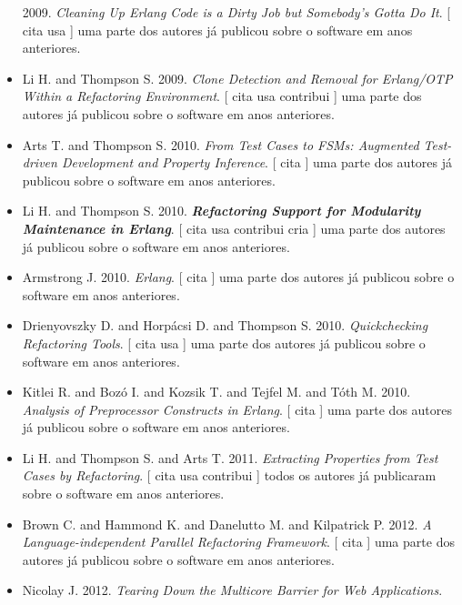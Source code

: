 \begin{itemize}
      2009.
        \textit{ Cleaning Up Erlang Code is a Dirty Job but Somebody's Gotta Do It}.
      [
          cita
          usa
      ]
uma parte dos autores já publicou sobre o software em anos anteriores.
\item Li H. and Thompson S.
      2009.
        \textit{ Clone Detection and Removal for Erlang/OTP Within a Refactoring Environment}.
      [
          cita
          usa
          contribui
      ]
uma parte dos autores já publicou sobre o software em anos anteriores.
\item Arts T. and Thompson S.
      2010.
        \textit{ From Test Cases to FSMs: Augmented Test-driven Development and Property Inference}.
      [
          cita
      ]
uma parte dos autores já publicou sobre o software em anos anteriores.
\item Li H. and Thompson S.
      2010.
        \textbf{\textit{ Refactoring Support for Modularity Maintenance in Erlang}}.
      [
          cita
          usa
          contribui
          cria
      ]
uma parte dos autores já publicou sobre o software em anos anteriores.
\item Armstrong J.
      2010.
        \textit{ Erlang}.
      [
          cita
      ]
uma parte dos autores já publicou sobre o software em anos anteriores.
\item Drienyovszky D. and Horp\'{a}csi D. and Thompson S.
      2010.
        \textit{ Quickchecking Refactoring Tools}.
      [
          cita
          usa
      ]
uma parte dos autores já publicou sobre o software em anos anteriores.
\item Kitlei R. and Boz\'{o} I. and Kozsik T. and Tejfel M. and T\'{o}th M.
      2010.
        \textit{ Analysis of Preprocessor Constructs in Erlang}.
      [
          cita
      ]
uma parte dos autores já publicou sobre o software em anos anteriores.
\item Li H. and Thompson S. and Arts T.
      2011.
        \textit{ Extracting Properties from Test Cases by Refactoring}.
      [
          cita
          usa
          contribui
      ]
todos os autores já publicaram sobre o software em anos anteriores.
\item Brown C. and Hammond K. and Danelutto M. and Kilpatrick P.
      2012.
        \textit{ A Language-independent Parallel Refactoring Framework}.
      [
          cita
      ]
uma parte dos autores já publicou sobre o software em anos anteriores.
\item Nicolay J.
      2012.
        \textit{ Tearing Down the Multicore Barrier for Web Applications}.

\end{itemize}
